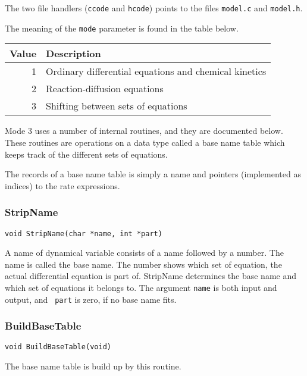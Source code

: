 The two file handlers ({\tt ccode} and {\tt hcode}) points to the
files {\tt model.c} and {\tt model.h}. 

The meaning of the {\tt mode} parameter is found in the table below.

\vspace{0.2cm}
\begin{center}
\begin{tabular}{rl}
\hline
\hfill Value & Description \\ \hline
1            & Ordinary differential equations and chemical kinetics
\\
2            & Reaction-diffusion equations \\
3            & Shifting between sets of equations \\
\hline
\end{tabular}
\end{center}
\vspace{0.2cm}

Mode 3 uses a number of internal routines, and they are documented
below. These routines are operations on a data type called a base name
table which keeps track of the different sets of equations.

The records of a base name table is simply a name and pointers
(implemented as indices) to the rate expressions.

\subsubsection{StripName}
\begin{verbatim}
void StripName(char *name, int *part)
\end{verbatim}

A name of dynamical variable consists of a name followed by a number.
The name is called the base name. The number shows 
which set of equation, the actual differential equation is part of.
StripName determines the base name and which set of equations it
belongs to. The argument {\tt name} is both input and output, and {\tt
  part} is zero, if no base name fits.

\subsubsection{BuildBaseTable}
\begin{verbatim}
void BuildBaseTable(void)
\end{verbatim}

The base name table is build up by this routine.

